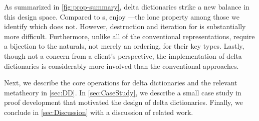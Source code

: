 As summarized in \autoref{fig:prop-summary}, delta dictionaries strike a new balance in this design space.
%
Compared to \cal{}s, \dds{} enjoy \SemTot{}---the lone property among those we identify which \cal{} does not.
%
However, destruction and iteration for \dds{} is substantially more difficult.
%
Furthermore, unlike all of the conventional representations, \dds{} require a bijection to the naturals, not merely an ordering, for their key types.
%
%
Lastly, though not a concern from a client's perspective, the implementation of delta dictionaries is considerably more involved than the conventional approaches.





%
%
Next, we describe the core operations for delta dictionaries and the relevant metatheory in \autoref{sec:DD}.
%
In \autoref{sec:CaseStudy}, we describe a small case study in proof development that motivated the design of delta dictionaries.
%
Finally, we conclude in \autoref{sec:Discussion} with a discussion of related work.
%


